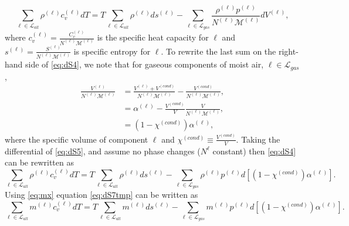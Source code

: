 \documentclass{agujournal}
\begin{document}
{\begin{equation}
\sum_{\ell \in \mathcal{L}_{all}}\rho^{(\ell)}c_v^{(\ell)}dT = T \sum_{\ell \in \mathcal{L}_{all}}\rho^{(\ell)}ds^{(\ell)}-\sum_{\ell \in \mathcal{L}_{gas}}\frac{\rho^{(\ell)}p^{(\ell)}}{N^{(\ell)}\mathcal{M}^{(\ell)}}dV^{(\ell)},\label{eq:dS4}
\end{equation}
where $c_v^{(\ell)}=\frac{C_v^{(\ell)}}{N^{(\ell)}\mathcal{M}^{(\ell)}}$ is the specific heat capacity for $\ell$ and $s^{(\ell)}=\frac{S^{(\ell)}}{N^{(\ell)}\mathcal{M}^{(\ell)}}$ is specific entropy for $\ell$. To rewrite the last sum on the right-hand side of \eqref{eq:dS4}, we note that for gaseous components of moist air, $\ell \in \mathcal{L}_{gas}$,  
\begin{align}
\frac{V^{(\ell)}}{N^{(\ell)}\mathcal{M}^{(\ell)}}&=\frac{V^{(\ell)}+V^{(cond)}}{N^{(\ell)}\mathcal{M}^{(\ell)}}-\frac{V^{(cond)}}{N^{(\ell)}\mathcal{M}^{(\ell)}},\\
&=\alpha^{(\ell)}-\frac{V^{(cond)}}{V}\frac{V}{N^{(\ell)}\mathcal{M}^{(\ell)}},\\
&=\left( 1-\chi^{(cond)}\right) \alpha^{(\ell)},\label{eq:dS5}
\end{align}
where {} the specific volume of component $\ell$ and $\chi^{(cond)}\equiv \frac{V^{(cond)}}{V}$. Taking the differential of \eqref{eq:dS5}, and assume no phase changes ($N^{\ell}$ constant) then \eqref{eq:dS4} can be rewritten as
\begin{equation}
\sum_{\ell \in \mathcal{L}_{all}}\rho^{(\ell)}c_v^{(\ell)}dT = T \sum_{\ell \in \mathcal{L}_{all}}\rho^{(\ell)}ds^{(\ell)}-\sum_{\ell \in \mathcal{L}_{gas}}\rho^{(\ell)}p^{(\ell)}d\left[ \left( 1-\chi^{(cond)}\right) \alpha^{(\ell)}\right].\label{eq:dS7tmp}
\end{equation}
Using \eqref{eq:mx} equation \eqref{eq:dS7tmp} can be written as
\begin{equation}
\sum_{\ell \in \mathcal{L}_{all}}m^{(\ell)}c_v^{(\ell)}dT = T \sum_{\ell \in \mathcal{L}_{all}}m^{(\ell)}ds^{(\ell)}-\sum_{\ell \in \mathcal{L}_{gas}}m^{(\ell)}p^{(\ell)}d\left[ \left( 1-\chi^{(cond)}\right) \alpha^{(\ell)}\right].\label{eq:dS7}
\end{equation}
}
\end{document}
